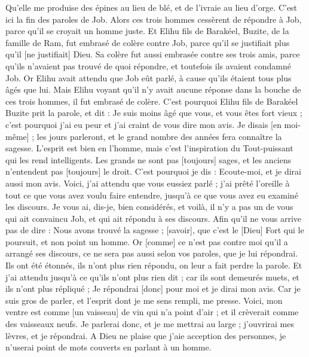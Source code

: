 \begin{multicols}{2}
Qu'elle me produise des épines au lieu de blé, et de l'ivraie au lieu d'orge. C'est ici la fin des paroles de Job.
\VerseOne{}Alors ces trois hommes cessèrent de répondre à Job, parce qu'il se croyait un homme juste.
Et Elihu fils de Barakéel, Buzite, de la famille de Ram, fut embrasé de colère contre Job, parce qu'il se justifiait plus qu'il [ne justifiait] Dieu.
Sa colère fut aussi embrasée contre ses trois amis, parce qu'ils n'avaient pas trouvé de quoi répondre, et toutefois ils avaient condamné Job.
Or Elihu avait attendu que Job eût parlé, à cause qu'ils étaient tous plus âgés que lui.
Mais Elihu voyant qu'il n'y avait aucune réponse dans la bouche de ces trois hommes, il fut embrasé de colère.
C'est pourquoi Elihu fils de Barakéel Buzite prit la parole, et dit : Je suis moins âgé que vous, et vous êtes fort vieux ; c'est pourquoi j'ai eu peur et j'ai craint de vous dire mon avis.
Je disais [en moi-même] ; les jours parleront, et le grand nombre des années fera connaître la sagesse.
L'esprit est bien en l'homme, mais c'est l'inspiration du Tout-puissant qui les rend intelligents.
Les grands ne sont pas [toujours] sages, et les anciens n'entendent pas [toujours] le droit.
C'est pourquoi je dis : Ecoute-moi, et je dirai aussi mon avis.
Voici, j'ai attendu que vous eussiez parlé ; j'ai prêté l'oreille à tout ce que vous avez voulu faire entendre, jusqu'à ce que vous avez eu examiné les discours.
Je vous ai, dis-je, bien considérés, et voilà, il n'y a pas un de vous qui ait convaincu Job, et qui ait répondu à ses discours.
Afin qu'il ne vous arrive pas de dire : Nous avons trouvé la sagesse ; [savoir], que c'est le [Dieu] Fort qui le poursuit, et non point un homme.
Or [comme] ce n'est pas contre moi qu'il a arrangé ses discours, ce ne sera pas aussi selon vos paroles, que je lui répondrai.
Ils ont été étonnés, ils n'ont plus rien répondu, on leur a fait perdre la parole.
Et j'ai attendu jusqu'à ce qu'ils n'ont plus rien dit ; car ils sont demeurés muets, et ils n'ont plus répliqué ;
Je répondrai [donc] pour moi et je dirai mon avis.
Car je suis gros de parler, et l'esprit dont je me sens rempli, me presse.
Voici, mon ventre est comme [un vaisseau] de vin qui n'a point d'air ; et il crèverait comme des vaisseaux neufs.
Je parlerai donc, et je me mettrai au large ; j'ouvrirai mes lèvres, et je répondrai.
A Dieu ne plaise que j'aie acception des personnes, je n'userai point de mots couverts en parlant à un homme.

\end{multicols}

